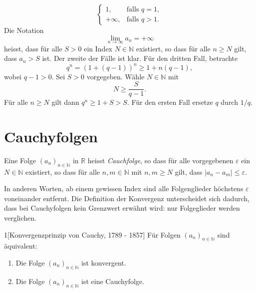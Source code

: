 \documentclass[../main.tex]{subfiles}
\begin{document}
\begin{examples}
\begin{enumerate}[(1)]
\[\begin{cases}
		    1, & \text{falls } q = 1, \\
		    +\infty, & \text{falls } q > 1.
	    \end{cases}
	  \]
	Die Notation
	\[
	  \lim_{n \to \infty} a_n = + \infty
	\]
	heisst, dass für alle $S > 0$ ein Index $N \in \mathbb{N}$
	existiert, so dass für alle $n \geq N$ gilt, dass
	$a_n > S$ ist.
	Der zweite der Fälle ist klar. Für den dritten Fall, 
	betrachte
	\[
		q^n = {\left( 1 + (q-1) \right)}^n \geq 1 + n(q-1),
	\]
	wobei $q-1 > 0$. 
	Sei $S > 0$ vorgegeben. Wähle $N \in \mathbb{N}$ mit
	\[
	  N \geq \frac{S}{q-1}.
	\]
	Für alle $n \geq N$ gilt dann $q^n \geq 1 + S > S$.
	Für den ersten Fall ersetze $q$ durch $1/q$.
\end{enumerate}
\end{examples}

\section{Cauchyfolgen}
\begin{definition}
Eine Folge 
${\left( a_n \right)}_{n \in \mathbb{N}}$ in $\mathbb{R}$ 
heisst \textit{Cauchfolge}, so dass für alle
vorgegebenen $\varepsilon$ ein $N \in \mathbb{N}$ existiert,
so dass für alle $n, m \in \mathbb{N}$ mit $n,m \geq N$ gilt,
dass $|a_n - a_m| \leq \varepsilon$.
\end{definition}

In anderen Worten, ab einem gewissen Index sind alle
Folgenglieder höchstens $\varepsilon$ voneinander 
entfernt. Die Definition der Konvergenz unterscheidet
sich dadurch, dass bei Cauchyfolgen kein Grenzwert
erwähnt wird: nur Folgeglieder werden verglichen.

\begin{manualtheorem}{1}[Konvergenzprinzip
  von Cauchy, 1789 - 1857]
Für Folgen ${\left( a_n \right)}_{n \in \mathbb{N}}$ 
  sind äquivalent:
  \begin{enumerate}[\normalfont(i)]
    \item Die Folge ${\left( a_n \right)}_{n \in \mathbb{N}}$
      ist konvergent.
    \item Die Folge ${\left( a_n \right)}_{n \in \mathbb{N}}$
      ist eine Cauchyfolge.
  \end{enumerate}
\end{manualtheorem}
\end{document}
